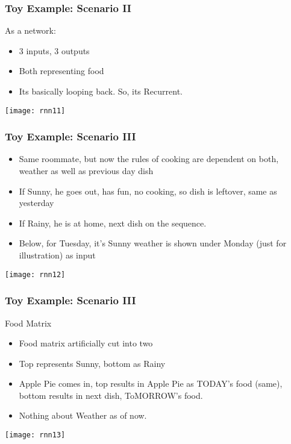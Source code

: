 \begin{frame}[fragile] \frametitle{Toy Example: Scenario II}
As a network:
\begin{itemize}
\item 3 inputs, 3 outputs
\item Both representing food
\item Its basically looping back. So, its Recurrent.
\end{itemize}
\begin{center}
\texttt{[image: rnn11]}
\end{center}
\end{frame}

\begin{frame}[fragile] \frametitle{Toy Example: Scenario III}
\begin{itemize}
\item Same roommate, but now the rules of cooking are dependent on both, weather as well as previous day dish
\item If Sunny, he goes out, has fun, no cooking, so dish is leftover, same as yesterday
\item If Rainy, he is at home, next dish on the sequence.
\item Below, for Tuesday, it's Sunny weather is shown under Monday (just for illustration) as input
\end{itemize}
\begin{center}
\texttt{[image: rnn12]}
\end{center}
\end{frame}


\begin{frame}[fragile] \frametitle{Toy Example: Scenario III}
Food Matrix
\begin{itemize}
\item Food matrix artificially cut into two
\item Top represents Sunny, bottom as Rainy
\item Apple Pie comes in, top results in Apple Pie as TODAY's food (same), bottom results in next dish, ToMORROW's food.
\item Nothing about Weather as of now.
\end{itemize}
\begin{center}
\texttt{[image: rnn13]}
\end{center}
\end{frame}


